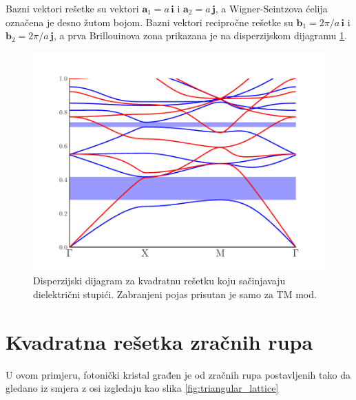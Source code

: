 \documentclass[utf8, seminar, numeric]{fer}
\begin{document}
Bazni vektori rešetke su vektori ${\mathbf{a}_1 = a \, \mathbf{i}}$ i
${\mathbf{a}_2= a \, \mathbf{j}}$, a Wigner-Seintzova ćelija označena je
desno žutom bojom. Bazni vektori recipročne rešetke su
${\mathbf{b}_1 = 2 \pi/a \, \mathbf{i}}$ i
${\mathbf{b}_2 = 2 \pi/a \, \mathbf{j}}$, a prva Brillouinova zona prikazana
je na disperzijskom dijagramu \ref{fig:square_band_diagram}.

\begin{figure}[ht]
	\centering
	\includegraphics[width = 0.8\linewidth]
		{./images/pdf/square_lattice_rods_band_diagram.pdf}
	\caption{Disperzijski dijagram za kvadratnu rešetku koju sačinjavaju
	dielektrični stupići. Zabranjeni pojas prisutan je samo za TM mod.}
	\label{fig:square_band_diagram}
\end{figure}

\FloatBarrier

\section{Kvadratna rešetka zračnih rupa} \label{sec:square_holes}

U ovom primjeru, fotonički kristal građen je od zračnih rupa
postavljenih tako da gledano iz smjera z osi izgledaju kao
slika \ref{fig:triangular_lattice}
\end{document}

